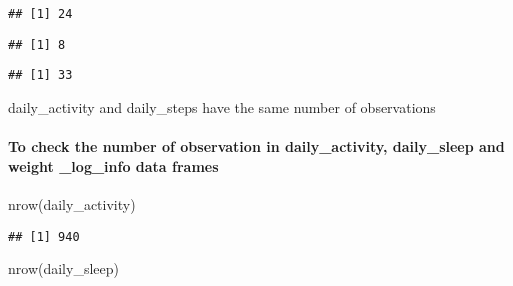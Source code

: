 \documentclass[
]{article}
\newenvironment{Shaded}{\begin{snugshade}}{\end{snugshade}}
\newcommand{\FunctionTok}[1]{\textcolor[rgb]{0.00,0.00,0.00}{#1}}
\newcommand{\NormalTok}[1]{#1}
\newcommand{\SpecialCharTok}[1]{\textcolor[rgb]{0.00,0.00,0.00}{#1}}
\begin{document}
\begin{verbatim}
## [1] 24
\end{verbatim}

\begin{Shaded}
\end{Shaded}

\begin{verbatim}
## [1] 8
\end{verbatim}

\begin{Shaded}
\end{Shaded}

\begin{verbatim}
## [1] 33
\end{verbatim}

daily\_activity and daily\_steps have the same number of observations

\hypertarget{to-check-the-number-of-observation-in-daily_activity-daily_sleep-and-weight-_log_info-data-frames}{%
\paragraph{To check the number of observation in daily\_activity,
daily\_sleep and weight \_log\_info data
frames}\label{to-check-the-number-of-observation-in-daily_activity-daily_sleep-and-weight-_log_info-data-frames}}

\begin{Shaded}
\begin{Highlighting}[]
\FunctionTok{nrow}\NormalTok{(daily\_activity)}
\end{Highlighting}
\end{Shaded}

\begin{verbatim}
## [1] 940
\end{verbatim}

\begin{Shaded}
\begin{Highlighting}[]
\FunctionTok{nrow}\NormalTok{(daily\_sleep)}
\end{Highlighting}
\end{Shaded}
\end{document}
